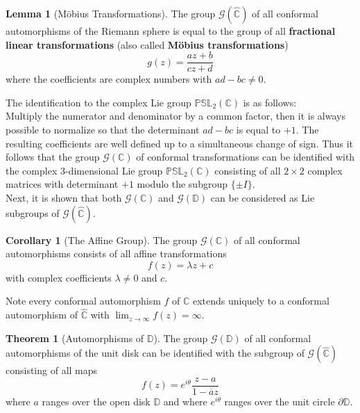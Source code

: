 \documentclass{article}
\theoremstyle{definition}
\newtheorem{theorem}{Theorem}
\newtheorem{lemma}{Lemma}
\newtheorem{corollary}{Corollary}
\begin{document}
    \begin{lemma}[Möbius Transformations]
        The group $\mathcal{G}(\hat{\mathbb{C}})$ of all conformal automorphisms of the Riemann sphere is equal to the group
        of all \textbf{fractional linear transformations} (also called \textbf{Möbius transformations})
        \[ g(z) = \frac{az+b}{cz+d} \]
        where the coefficients are complex numbers with $ad-bc\neq 0$.
    \end{lemma}

    The identification to the complex Lie group $\mathbb{PSL}_2(\mathbb{C})$ is as follows:\\
    Multiply the numerator and denominator by a common factor, then it is always possible to normalize so that the determinant
    $ad-bc$ is equal to $+1$. The resulting coefficients are well defined up to a simultaneous change of sign. Thus it follows
    that the group $\mathcal{G}(\mathbb{C})$ of conformal transformations can be identified with the complex 3-dimensional Lie
    group $\mathbb{PSL}_2(\mathbb{C})$ consisting of all $2\times 2$ complex matrices with determinant $+1$ modulo the subgroup
    $\{\pm I\}$.\\

    Next, it is shown that both $\mathcal{G}(\mathbb{C})$ and $\mathcal{G}(\mathbb{D})$ can be considered as Lie subgroups
    of $\mathcal{G}(\hat{\mathbb{C}})$.
    \begin{corollary}[The Affine Group]
        The group $\mathcal{G}(\mathbb{C})$ of all conformal automorphisms consists of all affine transformations
        \[ f(z) = \lambda z + c \]
        with complex coefficients $\lambda\neq 0$ and $c$.
    \end{corollary}

    Note every conformal automorphism $f$ of $\mathbb{C}$ extends uniquely to a conformal automorphism of $\hat{\mathbb{C}}$ with
    $\lim_{z\to\infty} f(z) = \infty$.

    \begin{theorem}[Automorphisms of $\mathbb{D}$]
        The group $\mathcal{G}(\mathbb{D})$ of all conformal automorphisms of the unit disk can be identified with the subgroup
        of $\mathcal{G}(\hat{\mathbb{C}})$ consisting of all maps
        \[ f(z) = e^{i\theta} \frac{z-a}{1-\overline{a}z} \]
        where $a$ ranges over the open disk $\mathbb{D}$ and where $e^{i\theta}$ ranges over the unit circle $\partial{\mathbb{D}}$.
    \end{theorem}
\end{document}
